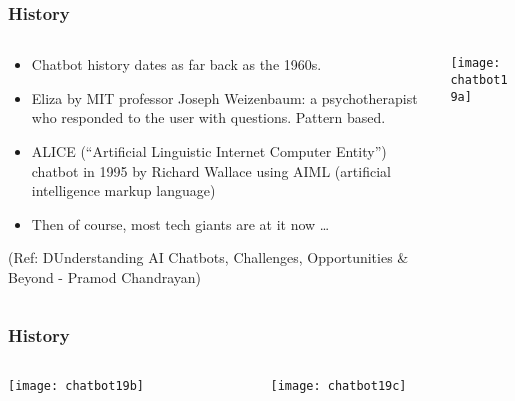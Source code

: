 \begin{frame}[fragile]\frametitle{History}

    \begin{columns}
    \begin{column}[t]{0.5\linewidth}
	\begin{itemize}
	\item Chatbot history dates as far back as the 1960s.
	\item Eliza by MIT professor Joseph Weizenbaum: a psychotherapist who responded to the user with questions. Pattern based.
	\item ALICE (``Artificial Linguistic Internet Computer Entity'') chatbot in 1995 by Richard Wallace using AIML (artificial intelligence markup language)
	\item Then of course, most tech giants are at it now \ldots
	\end{itemize}
	
\tiny{(Ref: DUnderstanding AI Chatbots, Challenges, Opportunities \& Beyond - Pramod Chandrayan)}

	
    \end{column}
    \begin{column}[t]{0.5\linewidth}
\begin{center}
\texttt{[image: chatbot19a]}

\end{center}
    \end{column}
  \end{columns}
  
  

	
\end{frame}

\begin{frame}[fragile]\frametitle{History}

    \begin{columns}
    \begin{column}[t]{0.5\linewidth}
\begin{center}
\texttt{[image: chatbot19b]}

\end{center}
    \end{column}
    \begin{column}[t]{0.5\linewidth}
\begin{center}
\texttt{[image: chatbot19c]}

\end{center}
    \end{column}
  \end{columns}
  
  

	
\end{frame}


